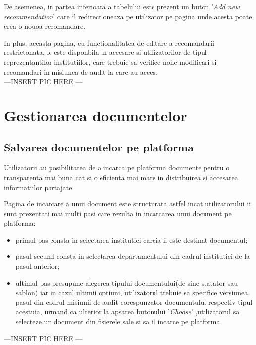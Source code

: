 De asemenea, in partea inferioara a tabelului este prezent un buton '\textit{Add new recommendation}' care il redirectioneaza pe utilizator pe pagina unde acesta poate crea o nouoa recomandare.

In plus, aceasta pagina, cu functionalitatea de editare a recomandarii restrictonata, le este disponbila in accesare si utilizatorilor de tipul reprezentantilor institutiilor, care trebuie sa verifice noile modificari si recomandari in misiunea de audit la care au acces.\\

---INSERT PIC HERE --- 	

\section{Gestionarea documentelor}

\subsection*{Salvarea documentelor pe platforma}

Utilizatorii au posibilitatea de a incarca pe platforma documente pentru o transparenta mai buna cat si o eficienta mai mare in distribuirea si accesarea informatiilor partajate.

Pagina de incarcare a unui document este structurata astfel incat utilizatorului ii sunt prezentati mai multi pasi care rezulta in incarcarea unui document pe platforma:
	
	\begin{itemize}
		\item  primul pas consta in selectarea institutiei careia ii este destinat documentul;
		
		\item pasul secund consta in selectarea departamentului din cadrul institutiei de la pasul anterior;
		
		\item ultimul pas presupune alegerea tipului documentului(de sine statator sau sablon) iar in cazul ultimii optiuni, utilizatorul trebuie sa specifice versiunea, pasul din cadrul misiunii de audit corespunzator documentului respectiv tipul acestuia, urmand ca ulterior la apsarea butonului '\textit{Choose}' ,utilizatorul sa selecteze un document din fisierele sale si sa il incarce pe platforma.
		
		
	\end{itemize}

---INSERT PIC HERE --- 


